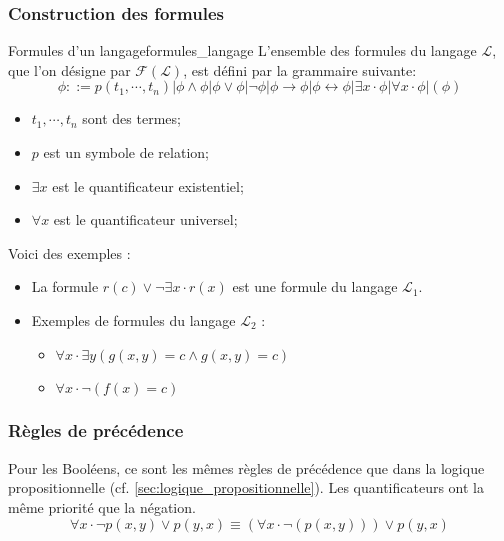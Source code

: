 \subsubsection{Construction des formules}
\label{subsubsec:construction_formules}
\begin{definition}{Formules d'un langage}{formules_langage}
    L'ensemble des formules du langage $\mathcal{L}$, que l'on désigne par $\mathcal{F(L)}$, est défini par la grammaire suivante:
    \begin{equation*}
        \phi ::= p(t_1,\cdots,t_n)|\phi\wedge\phi|\phi\vee\phi|\neg\phi|\phi\rightarrow\phi|\phi\leftrightarrow\phi|\exists x
        \cdot\phi|\forall x\cdot\phi|(\phi)
    \end{equation*}
    \begin{itemize}[label=\textbullet]
        \item $t_1,\cdots,t_n$ sont des termes;
        \item $p$ est un symbole de relation;
        \item $\exists x$ est le quantificateur existentiel;
        \item $\forall x$ est le quantificateur universel;
    \end{itemize}
\end{definition}
\begin{example}
    Voici des exemples :
    \begin{itemize}[label=\textbullet]
        \item La formule $r(c)\vee\neg\exists x\cdot r(x)$ est une formule du langage $\mathcal{L}_1$.
        \item Exemples de formules du langage $\mathcal{L}_2$ :
        \begin{itemize}[label=\textbullet]
            \item $\forall x\cdot\exists y(g(x,y) = c\wedge g(x,y) = c)$
            \item $\forall x\cdot\neg(f(x)=c)$
        \end{itemize}
    \end{itemize}
\end{example}

\subsubsection{Règles de précédence}
\label{subsubsec:règles_précédence}
Pour les Booléens, ce sont les mêmes règles de précédence que dans la logique propositionnelle (cf. \ref{sec:logique_propositionnelle}).
Les quantificateurs ont la même priorité que la négation.
\begin{equation*}
    \forall x\cdot\neg p(x,y)\vee p(y,x) \equiv (\forall x\cdot\neg(p(x,y)))\vee p(y,x)
\end{equation*}

